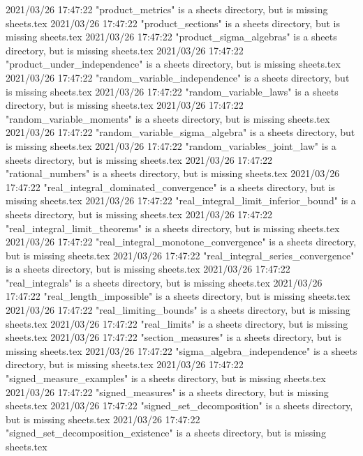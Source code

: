 2021/03/26 17:47:22 "product_metrics" is a sheets directory, but is missing sheets.tex
2021/03/26 17:47:22 "product_sections" is a sheets directory, but is missing sheets.tex
2021/03/26 17:47:22 "product_sigma_algebras" is a sheets directory, but is missing sheets.tex
2021/03/26 17:47:22 "product_under_independence" is a sheets directory, but is missing sheets.tex
2021/03/26 17:47:22 "random_variable_independence" is a sheets directory, but is missing sheets.tex
2021/03/26 17:47:22 "random_variable_laws" is a sheets directory, but is missing sheets.tex
2021/03/26 17:47:22 "random_variable_moments" is a sheets directory, but is missing sheets.tex
2021/03/26 17:47:22 "random_variable_sigma_algebra" is a sheets directory, but is missing sheets.tex
2021/03/26 17:47:22 "random_variables_joint_law" is a sheets directory, but is missing sheets.tex
2021/03/26 17:47:22 "rational_numbers" is a sheets directory, but is missing sheets.tex
2021/03/26 17:47:22 "real_integral_dominated_convergence" is a sheets directory, but is missing sheets.tex
2021/03/26 17:47:22 "real_integral_limit_inferior_bound" is a sheets directory, but is missing sheets.tex
2021/03/26 17:47:22 "real_integral_limit_theorems" is a sheets directory, but is missing sheets.tex
2021/03/26 17:47:22 "real_integral_monotone_convergence" is a sheets directory, but is missing sheets.tex
2021/03/26 17:47:22 "real_integral_series_convergence" is a sheets directory, but is missing sheets.tex
2021/03/26 17:47:22 "real_integrals" is a sheets directory, but is missing sheets.tex
2021/03/26 17:47:22 "real_length_impossible" is a sheets directory, but is missing sheets.tex
2021/03/26 17:47:22 "real_limiting_bounds" is a sheets directory, but is missing sheets.tex
2021/03/26 17:47:22 "real_limits" is a sheets directory, but is missing sheets.tex
2021/03/26 17:47:22 "section_measures" is a sheets directory, but is missing sheets.tex
2021/03/26 17:47:22 "sigma_algebra_independence" is a sheets directory, but is missing sheets.tex
2021/03/26 17:47:22 "signed_measure_examples" is a sheets directory, but is missing sheets.tex
2021/03/26 17:47:22 "signed_measures" is a sheets directory, but is missing sheets.tex
2021/03/26 17:47:22 "signed_set_decomposition" is a sheets directory, but is missing sheets.tex
2021/03/26 17:47:22 "signed_set_decomposition_existence" is a sheets directory, but is missing sheets.tex

